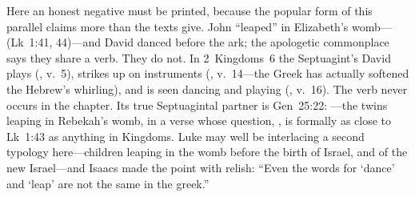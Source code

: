 Here an honest negative must be printed, because the popular form of this
parallel claims more than the texts give. John ``leaped'' in Elizabeth's
womb--- (Lk~1:41, 44)---and David danced before the ark;
the apologetic commonplace says they share a verb. They do not. In
2~Kingdoms~6 the Septuagint's David plays (, v.~5), strikes
up on instruments (, v.~14---the Greek has actually
softened the Hebrew's whirling), and is seen dancing and playing
(, v.~16). The verb 
never occurs in the chapter. Its true Septuagintal partner is Gen~25:22:
---the twins leaping in Rebekah's
womb, in a verse whose question, , is formally as
close to Lk~1:43 as anything in Kingdoms. Luke may well be interlacing a
second typology here---children leaping in the womb before the birth of
Israel, and of the new Israel---and Isaacs made the point with relish:
``Even the words for `dance' and `leap' are not the same in the
greek.''

